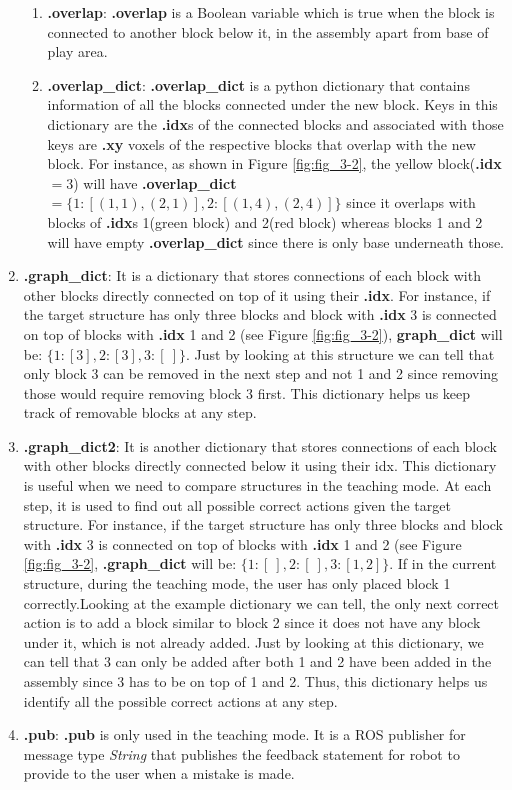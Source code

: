 \begin{enumerate}
\begin{enumerate}
        \item \textbf{.overlap}: \textbf{.overlap} is a Boolean variable which is true when the block is connected to another block below it, in the assembly apart from base of play area.
        \item \textbf{.overlap\_dict}: \textbf{.overlap\_dict} is a python dictionary that contains information of all the blocks connected under the new block. Keys in this dictionary are the \textbf{.idx}s of the connected blocks and associated with those keys are \textbf{.xy} voxels of the respective blocks that overlap with the new block. For instance, as shown in Figure \ref{fig:fig_3-2}, the yellow block(\textbf{.idx} $ = 3$) will have \textbf{.overlap\_dict}  $= \{1:[(1,1),(2,1)], 2:[(1,4),(2,4)]\}$ since it overlaps with blocks of \textbf{.idx}s 1(green block) and 2(red block) whereas blocks 1 and 2 will have empty \textbf{.overlap\_dict} since there is only base underneath those.
    \end{enumerate}
    \item \textbf{.graph\_dict}: It is a dictionary that stores connections of each block with other blocks directly connected on top of it using their \textbf{.idx}. For instance, if the target structure has only three blocks and block with \textbf{.idx} 3 is connected on top of blocks with \textbf{.idx} 1 and 2 (see Figure \ref{fig:fig_3-2}), \textbf{graph\_dict} will be: $\{1: [3], 2: [3], 3:[\:]\}$. Just by looking at this structure we can tell that only block 3 can be removed in the next step and not 1 and 2 since removing those would require removing block 3 first. This dictionary helps us keep track of removable blocks at any step. 
    \item \textbf{.graph\_dict2}: It is another dictionary that stores connections of each block with other blocks directly connected below it using their idx. This dictionary is useful when we need to compare structures in the teaching mode. At each step, it is used to find out all possible correct actions given the target structure. For instance, if the target structure has only three blocks and block with \textbf{.idx} 3 is connected on top of blocks with \textbf{.idx} 1 and 2 (see Figure \ref{fig:fig_3-2}, \textbf{.graph\_dict} will be: $\{1: [\:], 2: [\:], 3:[1,2]\}$.  If in the current structure, during the teaching mode, the user has only placed block 1 correctly.Looking at the example dictionary we can tell, the only next correct action is to add a block similar to block 2 since it does not have any block under it, which is not already added. Just by looking at this dictionary, we can tell that 3 can only be added after both 1 and 2 have been added in the assembly since 3 has to be on top of 1 and 2. Thus, this dictionary helps us identify all the possible correct actions at any step.
    \item \textbf{.pub}: \textbf{.pub} is only used in the teaching mode. It is a ROS publisher for message type \emph{String} that publishes the feedback statement for robot to provide to the user when a mistake is made. 
\end{enumerate}
